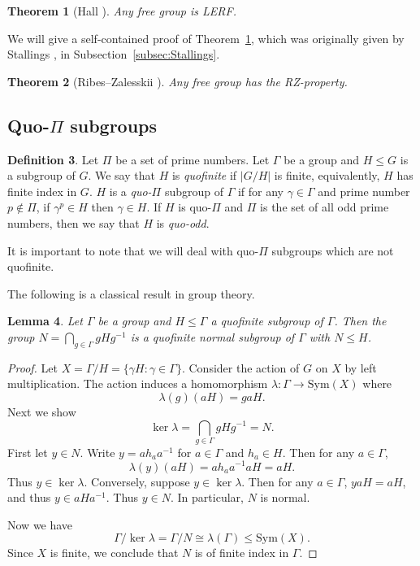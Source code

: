 \documentclass[11pt]{amsart}
\newtheorem{theorem}{Theorem}[section]
\newtheorem{lemma}[theorem]{Lemma}
\theoremstyle{definition}
\newtheorem{definition}[theorem]{Definition}
\theoremstyle{definition}
\numberwithin{equation}{section}
\DeclareMathOperator{\Ker}{ker}
\begin{document}
\begin{theorem}[Hall \cite{Ha49}]\label{thm:Hall} Any free group is LERF.
\end{theorem}

We will give a self-contained proof of Theorem~\ref{thm:Hall}, which was originally given by Stallings \cite{St83}, in Subsection~\ref{subsec:Stallings}.

\begin{theorem}[Ribes--Zalesskii \cite{RZ93}] Any free group has the RZ-property.
\end{theorem}





\subsection{Quo-$\Pi$ subgroups}

\begin{definition} Let $\Pi$ be a set of prime numbers. Let $\Gamma$ be a group and $H\leq G$ is a subgroup of $G$. We say that $H$ is {\em quofinite} if $|G/H|$ is finite, equivalently, $H$ has finite index in $G$.
$H$ is a {\em quo-$\Pi$} subgroup of $\Gamma$ if for any $\gamma\in \Gamma$ and prime number $p\not\in \Pi$, if $\gamma^p\in H$ then $\gamma\in H$. If $H$ is quo-$\Pi$ and $\Pi$ is the set of all odd prime numbers, then we say that $H$ is {\em quo-odd}.
\end{definition}

It is important to note that we will deal with quo-$\Pi$ subgroups which are not quofinite.

The following is a classical result in group theory.

\begin{lemma}\label{lem:quofinitenormal} Let $\Gamma$ be a group and $H\leq \Gamma$ a quofinite subgroup of $\Gamma$. Then the group 
$N=\bigcap_{g\in \Gamma}gHg^{-1}$ is a quofinite normal subgroup of $\Gamma$ with $N\leq H$.
\end{lemma}

\begin{proof} Let $X=\Gamma/H=\{\gamma H\colon \gamma\in \Gamma\}$. Consider the action of $G$ on $X$ by left multiplication. The action induces a homomorphism $\lambda\colon \Gamma\to \mbox{Sym}(X)$ where 
$$\lambda(g)(aH)=gaH. $$
Next we show
$$ \Ker\lambda=\bigcap_{g\in \Gamma} gHg^{-1}=N. $$
First let $y\in N$. Write $y=ah_aa^{-1}$ for $a\in \Gamma$ and $h_a\in H$. Then for any $a\in \Gamma$, 
$$ \lambda(y)(aH)=ah_aa^{-1}aH=aH. $$
Thus $y\in \Ker\lambda$. Conversely, suppose $y\in \Ker\lambda$. Then for any $a\in \Gamma$, $yaH=aH$, and thus $y\in aHa^{-1}$. Thus $y\in N$. In particular, $N$ is normal.

Now we have
$$ \Gamma/\Ker\lambda=\Gamma/N\cong \lambda(\Gamma)\leq \mbox{Sym}(X). $$
Since $X$ is finite, we conclude that $N$ is of finite index in $\Gamma$.
\end{proof}
\end{document}
